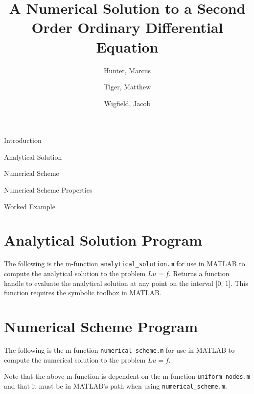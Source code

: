 \documentclass{article}
\title{
	{A Numerical Solution to a Second Order Ordinary Differential Equation}\\
}
\author{
	Hunter, Marcus \\
	\and
	Tiger, Matthew \\
	\and
	Wigfield, Jacob \\
}
\begin{document}
\maketitle
\newpage


\tableofcontents
\newpage


\begin{section}{Introduction}
  
\end{section}


\begin{section}{Analytical Solution}
  
\end{section}


\begin{section}{Numerical Scheme}\label{sec:scheme}
  
\end{section}


\begin{section}{Numerical Scheme Properties}\label{sec:scheme_prop}
  
\end{section}


\begin{section}{Worked Example}
  
\end{section}


\newpage
\begin{appendices}
  \section{Analytical Solution Program}
  The following is the m-function \texttt{analytical\_solution.m} for use in
  MATLAB to compute the analytical solution to the problem $Lu = f$. Returns
  a function handle to evaluate the analytical solution at any point on the
  interval [0, 1]. This function requires the symbolic toolbox in MATLAB.
  

  \section{Numerical Scheme Program}
  The following is the m-function \texttt{numerical\_scheme.m} for use in MATLAB
  to compute the numerical solution to the problem $Lu = f$.
  

  Note that the above m-function is dependent on the m-function
  \texttt{uniform\_nodes.m} and that it must be in MATLAB's path when using
  \texttt{numerical\_scheme.m}.
  
\end{appendices}
\end{document}
